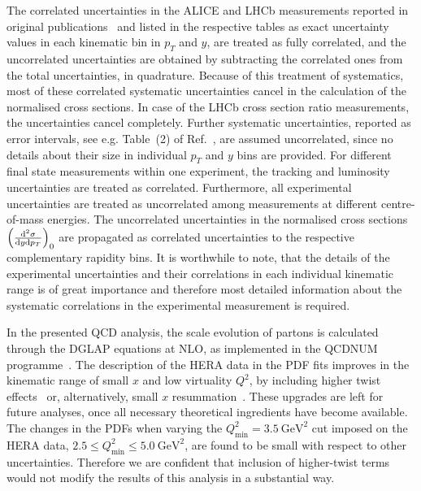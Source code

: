 \documentclass[12pt]{article}
\begin{document}
The correlated uncertainties in the ALICE and LHCb measurements reported in original publications~\cite{Aaij:2016jht, Aaij:2013mga, Aaij:2015bpa, Acharya:2019mgn, Acharya:2017jgo, Aaij:2013noa} and listed in the respective tables as exact uncertainty values in each kinematic bin in $p_T$ and $y$, 
are treated as fully correlated, and the uncorrelated uncertainties are obtained by subtracting the correlated ones from the 
total uncertainties, in quadrature. Because of this treatment of systematics, most of these correlated systematic uncertainties cancel in the calculation of the normalised cross sections. In case of the LHCb cross section ratio measurements, the uncertainties cancel completely. Further systematic uncertainties, reported as error intervals, see e.g. Table~(2) of Ref.~\cite{Aaij:2016jht}, are assumed uncorrelated, since no details about their size in individual $p_T$ and $y$ bins are provided. 
For different final state measurements within one experiment, the tracking and luminosity uncertainties are treated as correlated. 
Furthermore, all experimental uncertainties are treated as uncorrelated among measurements at different centre-of-mass energies. 
The uncorrelated uncertainties in the normalised cross sections $\left(\frac{{\rm d}^2\sigma}{{\rm d}y{\rm d}p_T}\right)_{0}$ are propagated as correlated uncertainties to the respective complementary rapidity bins.
It is worthwhile to note, that the details of the experimental uncertainties and their correlations in each individual kinematic range is of great importance and therefore most detailed information about the systematic correlations in the experimental measurement is required.

In the presented QCD analysis, the scale evolution of partons is calculated through the DGLAP equations at NLO, as implemented in 
the QCDNUM programme~\cite{Botje:2010ay}.  
The description of the HERA data in the PDF fits improves in the kinematic range of small $x$ and low virtuality $Q^2$, by including higher twist effects~\cite{Accardi:2016ndt,Alekhin:2017kpj}
or, alternatively, small $x$ resummation~\cite{Ball:2017otu,Abdolmaleki:2018jln}. 
These upgrades are left for future analyses, once all necessary theoretical ingredients have become available. 
The changes in the PDFs when varying the $Q^2_{\text{min}} = 3.5~\textrm{GeV}^2$ cut imposed on the HERA data, $2.5 \leq Q^2_\textrm{min}\leq 5.0~\textrm{GeV}^2$, are found to be small with respect to other uncertainties. 
Therefore we are confident that inclusion of higher-twist terms would not modify the results of this analysis in a substantial way.
\end{document}
